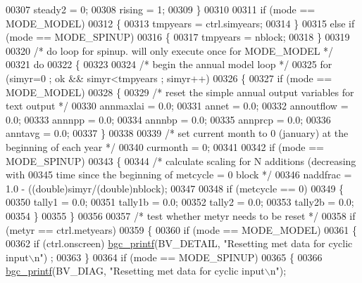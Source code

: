 \begin{DoxyCode}
00307       steady2 = 0;
00308       rising = 1;
00309     \}
00310 
00311     \textcolor{keywordflow}{if} (mode == MODE\_MODEL)
00312     \{
00313         tmpyears = ctrl.simyears;
00314     \}
00315     \textcolor{keywordflow}{else} \textcolor{keywordflow}{if} (mode == MODE\_SPINUP)
00316     \{
00317         tmpyears = nblock;
00318     \}
00319     
00320     \textcolor{comment}{/* do loop for spinup. will only execute once for MODE\_MODEL */}
00321     \textcolor{keywordflow}{do}
00322     \{
00323     
00324     \textcolor{comment}{/* begin the annual model loop */}
00325     \textcolor{keywordflow}{for} (simyr=0 ; ok && simyr<tmpyears ; simyr++)
00326     \{
00327         \textcolor{keywordflow}{if} (mode == MODE\_MODEL)
00328         \{
00329             \textcolor{comment}{/* reset the simple annual output variables for text output */}
00330             annmaxlai = 0.0;
00331             annet = 0.0;
00332             annoutflow = 0.0;
00333             annnpp = 0.0;
00334             annnbp = 0.0;
00335             annprcp = 0.0;
00336             anntavg = 0.0;
00337         \}
00338         
00339         \textcolor{comment}{/* set current month to 0 (january) at the beginning of each year */}
00340         curmonth = 0;
00341 
00342         \textcolor{keywordflow}{if} (mode == MODE\_SPINUP)
00343         \{
00344             \textcolor{comment}{/* calculate scaling for N additions (decreasing with}
00345 \textcolor{comment}{            time since the beginning of metcycle = 0 block */}
00346             naddfrac = 1.0 - ((double)simyr/(\textcolor{keywordtype}{double})nblock);
00347 
00348             \textcolor{keywordflow}{if} (metcycle == 0)
00349             \{
00350                 tally1 = 0.0;
00351                 tally1b = 0.0;
00352                 tally2 = 0.0;
00353                 tally2b = 0.0;
00354             \}
00355         \}
00356         
00357         \textcolor{comment}{/* test whether metyr needs to be reset */}
00358         \textcolor{keywordflow}{if} (metyr == ctrl.metyears)
00359         \{
00360             \textcolor{keywordflow}{if} (mode == MODE\_MODEL)
00361             \{
00362                 \textcolor{keywordflow}{if} (ctrl.onscreen) \hyperlink{bgc__io_8c_af287cce6e2aede1ce337de9319e80d0d}{bgc\_printf}(BV\_DETAIL, \textcolor{stringliteral}{"Resetting met data for cyclic input\(\backslash\)n"})
      ;
00363             \}
00364             \textcolor{keywordflow}{if} (mode == MODE\_SPINUP)
00365             \{
00366                 \hyperlink{bgc__io_8c_af287cce6e2aede1ce337de9319e80d0d}{bgc\_printf}(BV\_DIAG, \textcolor{stringliteral}{"Resetting met data for cyclic input\(\backslash\)n"});

\end{DoxyCode}
